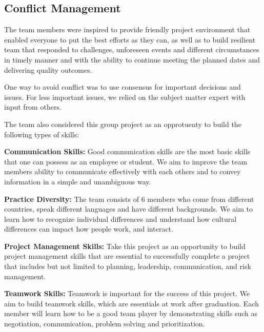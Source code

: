 \documentclass{article}
\begin{document}
\newline
\hfill \break
\subsection{Conflict Management}
The team members were inspired to provide friendly project environment that enabled everyone to put the best efforts as they can, as well as to build resilient team that responded to challenges, unforeseen events and different circumstances in timely manner and with the ability to continue meeting the planned dates and delivering quality outcomes.

One way to avoid conflict was to use consensus for important decisions and issues. For less important issues, we relied on the subject matter expert with input from others.
\newline
\hfill \break

The team also considered this group project as an opprotuenty to build the following types of skills:

\newline
\hfill \break
\textbf{Communication Skills:}
Good communication skills are the most basic skills that one can possess as an employee or student. We aim to improve the team members ability to communicate effectively with each others and to convey information in a simple and unambiguous way.

\newline
\hfill \break
\textbf{Practice Diversity:}
The team consists of 6 members who come from different countries, speak different languages and have different backgrounds. We aim to learn how to recognize individual differences and understand how cultural differences can impact how people work, and interact.

\newline
\hfill \break
\textbf{Project Management Skills:}
Take this project as an opportunity to build project management skills that are essential to successfully complete a project that includes but not limited to planning, leadership, communication, and risk management.

\newline
\hfill \break
\textbf{Teamwork Skills:}
Teamwork is important for the success of this project. We aim to build teamwork skills, which are essentials at work after graduation. Each member will learn how to be a good team player by demonstrating skills such as negotiation, communication, problem solving and prioritization.
\end{document}

